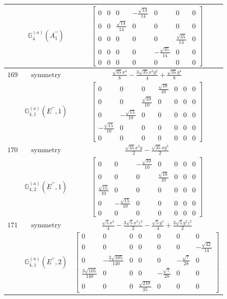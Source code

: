 \documentclass[fleqn,8pt,landscape]{jsarticle}
\begin{document}
\begin{longtable}{ccc}
$  $ & $ \mathbb{G}_{4}^{(a)}(A_{1}^{\prime\prime}) $ & $ \begin{bmatrix} 0 & 0 & 0 & - \frac{\sqrt{14}}{14} & 0 & 0 & 0 \\ 0 & 0 & \frac{\sqrt{14}}{14} & 0 & 0 & 0 & 0 \\ 0 & 0 & 0 & 0 & 0 & \frac{\sqrt{35}}{14} & 0 \\ 0 & 0 & 0 & 0 & - \frac{\sqrt{35}}{14} & 0 & 0 \\ 0 & 0 & 0 & 0 & 0 & 0 & 0 \end{bmatrix} $ \\ \hline
$ 169 $ & $ \text{symmetry} $ & $ \frac{\sqrt{35} x^{4}}{8} - \frac{3 \sqrt{35} x^{2} y^{2}}{4} + \frac{\sqrt{35} y^{4}}{8} $ \\
$  $ & $ \mathbb{G}_{4,1}^{(a)}(E^{\prime\prime},1) $ & $ \begin{bmatrix} 0 & 0 & 0 & \frac{\sqrt{10}}{10} & 0 & 0 & 0 \\ 0 & 0 & \frac{\sqrt{10}}{10} & 0 & 0 & 0 & 0 \\ 0 & - \frac{\sqrt{15}}{10} & 0 & 0 & 0 & 0 & 0 \\ - \frac{\sqrt{15}}{10} & 0 & 0 & 0 & 0 & 0 & 0 \\ 0 & 0 & 0 & 0 & 0 & 0 & 0 \end{bmatrix} $ \\ \hline
$ 170 $ & $ \text{symmetry} $ & $ \frac{\sqrt{35} x^{3} y}{2} - \frac{\sqrt{35} x y^{3}}{2} $ \\
$  $ & $ \mathbb{G}_{4,2}^{(a)}(E^{\prime\prime},1) $ & $ \begin{bmatrix} 0 & 0 & - \frac{\sqrt{10}}{10} & 0 & 0 & 0 & 0 \\ 0 & 0 & 0 & \frac{\sqrt{10}}{10} & 0 & 0 & 0 \\ \frac{\sqrt{15}}{10} & 0 & 0 & 0 & 0 & 0 & 0 \\ 0 & - \frac{\sqrt{15}}{10} & 0 & 0 & 0 & 0 & 0 \\ 0 & 0 & 0 & 0 & 0 & 0 & 0 \end{bmatrix} $ \\ \hline
$ 171 $ & $ \text{symmetry} $ & $ \frac{\sqrt{5} x^{4}}{4} - \frac{3 \sqrt{5} x^{2} z^{2}}{2} - \frac{\sqrt{5} y^{4}}{4} + \frac{3 \sqrt{5} y^{2} z^{2}}{2} $ \\
$  $ & $ \mathbb{G}_{4,1}^{(a)}(E^{\prime\prime},2) $ & $ \begin{bmatrix} 0 & 0 & 0 & 0 & 0 & 0 & 0 \\ 0 & 0 & 0 & 0 & 0 & 0 & - \frac{\sqrt{42}}{14} \\ 0 & - \frac{3 \sqrt{105}}{140} & 0 & 0 & 0 & - \frac{\sqrt{7}}{28} & 0 \\ \frac{3 \sqrt{105}}{140} & 0 & 0 & 0 & - \frac{\sqrt{7}}{28} & 0 & 0 \\ 0 & 0 & 0 & \frac{\sqrt{210}}{35} & 0 & 0 & 0 \end{bmatrix} $ \\ \hline

\end{longtable}
\end{document}
